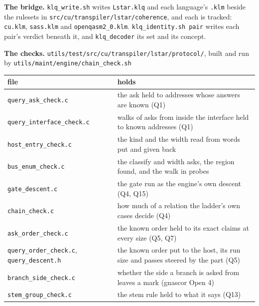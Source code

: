 \textbf{The bridge.} \texttt{klq\_\allowbreak{}write.\allowbreak{}sh} writes \texttt{Lstar.\allowbreak{}klq} and each language's \texttt{.\allowbreak{}klm} beside the rulesets in \texttt{src/\allowbreak{}cu/\allowbreak{}transpiler/\allowbreak{}lstar/\allowbreak{}coherence}, and each is tracked: \texttt{cu.\allowbreak{}klm}, \texttt{sass.\allowbreak{}klm} and \texttt{openqasm2\_\allowbreak{}0.\allowbreak{}klm}. \texttt{klq\_\allowbreak{}identity.\allowbreak{}sh pair} writes each pair's verdict beneath it, and \texttt{klq\_\allowbreak{}decoder} its set and its concept.

\textbf{The checks.} \texttt{utils/\allowbreak{}test/\allowbreak{}src/\allowbreak{}cu/\allowbreak{}transpiler/\allowbreak{}lstar/\allowbreak{}protocol/\allowbreak{}}, built and run by \texttt{utils/\allowbreak{}maint/\allowbreak{}engine/\allowbreak{}chain\_\allowbreak{}check.\allowbreak{}sh}

{\small
\setlength{\tabcolsep}{6pt}
\begin{longtable}{>{\RaggedRight\arraybackslash}p{}>{\RaggedRight\arraybackslash}p{}}
\toprule
file & holds \\
\midrule
\endhead
\texttt{query\_\allowbreak{}ask\_\allowbreak{}check.\allowbreak{}c} & the ask held to addresses whose answers are known (Q1) \\
\texttt{query\_\allowbreak{}interface\_\allowbreak{}check.\allowbreak{}c} & walks of asks from inside the interface held to known addresses (Q1) \\
\texttt{host\_\allowbreak{}entry\_\allowbreak{}check.\allowbreak{}c} & the kind and the width read from words put and given back \\
\texttt{bus\_\allowbreak{}enum\_\allowbreak{}check.\allowbreak{}c} & the classify and width asks, the region found, and the walk in probes \\
\texttt{gate\_\allowbreak{}descent.\allowbreak{}c} & the gate run as the engine's own descent (Q4, Q15) \\
\texttt{chain\_\allowbreak{}check.\allowbreak{}c} & how much of a relation the ladder's own cases decide (Q4) \\
\texttt{ask\_\allowbreak{}order\_\allowbreak{}check.\allowbreak{}c} & the known order held to its exact claims at every size (Q5, Q7) \\
\texttt{query\_\allowbreak{}order\_\allowbreak{}check.\allowbreak{}c}, \texttt{query\_\allowbreak{}descent.\allowbreak{}h} & the known order put to the host, its run size and passes steered by the part (Q5) \\
\texttt{branch\_\allowbreak{}side\_\allowbreak{}check.\allowbreak{}c} & whether the side a branch is asked from leaves a mark (gnascor Open 4) \\
\texttt{stem\_\allowbreak{}group\_\allowbreak{}check.\allowbreak{}c} & the stem rule held to what it says (Q13) \\
\bottomrule
\end{longtable}
}

